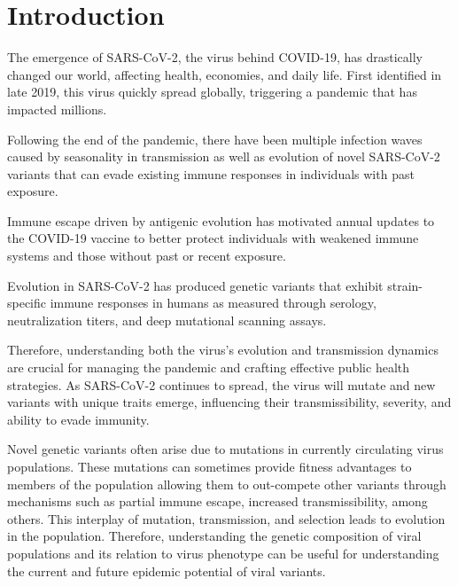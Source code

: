 \chapter{Introduction}

The emergence of SARS-CoV-2, the virus behind COVID-19, has drastically changed our world, affecting health, economies, and daily life. 
First identified in late 2019, this virus quickly spread globally, triggering a pandemic that has impacted millions.

Following the end of the pandemic, there have been multiple infection waves caused by seasonality in transmission as well as evolution of novel SARS-CoV-2 variants that can evade existing immune responses in individuals with past exposure.


Immune escape driven by antigenic evolution has motivated annual updates to the COVID-19 vaccine to better protect individuals with weakened immune systems and those without past or recent exposure.

Evolution in SARS-CoV-2 has produced genetic variants that exhibit strain-specific immune responses in humans as measured through serology, neutralization titers, and deep mutational scanning assays. %

Therefore, understanding both the virus's evolution and transmission dynamics are crucial for managing the pandemic and crafting effective public health strategies.
As SARS-CoV-2 continues to spread, the virus will mutate and new variants with unique traits emerge, influencing their transmissibility, severity, and ability to evade immunity.

Novel genetic variants often arise due to mutations in currently circulating virus populations.
These mutations can sometimes provide fitness advantages to members of the population allowing them to out-compete other variants through mechanisms such as partial immune escape, increased transmissibility, among others.
This interplay of mutation, transmission, and selection leads to evolution in the population.
Therefore, understanding the genetic composition of viral populations and its relation to virus phenotype can be useful for understanding the current and future epidemic potential of viral variants.

